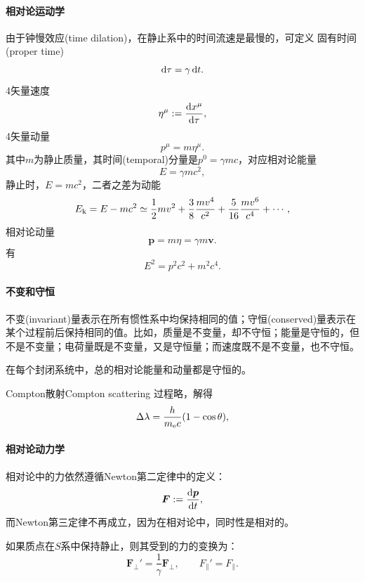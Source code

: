 \paragraph{相对论运动学}
由于钟慢效应(time dilation)，在静止系中的时间流速是最慢的，可定义
固有时间(proper time)
\[
    \mathop{}\!\mathrm{d}\tau=\gamma\mathop{}\!\mathrm{d} t.
\]
4矢量速度
\begin{equation}
    \eta^\mu:=\frac{\mathrm{d}^{\;\!\!}x^\mu}{\mathrm{d} \tau^{\;\!\!}},
\end{equation}
4矢量动量 
\[
    p^\mu=m\eta^\mu.
\]
其中$m$为静止质量，其时间(temporal)分量是$p^0=\gamma mc$，对应相对论能量
\[
    E=\gamma mc^2,
\]
静止时，$E=mc^2$，二者之差为动能
\[
    E_{\mathrm k}=E-mc^2\simeq\frac12mv^2+\frac38\frac{mv^4}{c^2}+\frac5{16}\frac{mv^6}{c^4}+\cdots,
\]
相对论动量
\[
    \bm p=m\eta=\gamma m\bm v.
\]
有
\begin{equation}
    E^2=p^2c^2+m^2c^4.
\end{equation}
\paragraph{不变和守恒}
不变(invariant)量表示在所有惯性系中均保持相同的值；守恒(conserved)量表示在某个过程前后保持相同的值。比如，质量是不变量，却不守恒；能量是守恒的，但不是不变量；电荷量既是不变量，又是守恒量；而速度既不是不变量，也不守恒。

在每个封闭系统中，总的相对论能量和动量都是守恒的。
\begin{example}{Compton散射}{Compton scattering}
    过程略，解得
    \[
        \Delta\lambda=\frac h{m_\mathrm e c}(1-\cos\theta),
    \]
\end{example}
\paragraph{相对论动力学}
相对论中的力依然遵循Newton第二定律中的定义：
\[
    \bm F:=\frac{\mathrm{d}^{\;\!\!}\bm p}{\mathrm{d} t^{\;\!\!}},
\]
而Newton第三定律不再成立，因为在相对论中，同时性是相对的。

如果质点在$S$系中保持静止，则其受到的力的变换为：
\begin{equation}
    \bm F_\perp'=\frac1\gamma\bm F_\perp,\qquad F_\parallel'=F_\parallel.
\end{equation}
